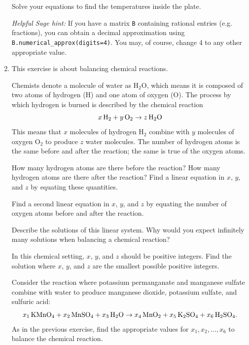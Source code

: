 \documentclass[12pt]{article}
\newcommand{\vs}[1]{\vspace{#1in}}
\begin{document}
\begin{enumerate}
  Solve your equations to find the temperatures
  inside the plate.

  {\em Helpful Sage hint:}  If you have a matrix
  {\tt B} containing rational entries (e.g. fractions), you can obtain
  a decimal approximation using {\tt B.numerical\_approx(digits=4)}.
  You may, of course, change 4 to any other appropriate value.
  
  \vs{2}

\item This exercise is about balancing chemical reactions.

  Chemists denote a molecule of water as
  $\text{H}_2\text{O}$, which means it is composed of two
  atoms of hydrogen (H) and one atom of oxygen (O).
  The process by which hydrogen is burned is described by the
  chemical reaction
  $$
  x\thinspace \text{H}_2 + y\thinspace\text{O}_2 \to
  z\thinspace \text{H}_2\text{O}
  $$
  This means that $x$ molecules of hydrogen
  $\text{H}_2$ combine with $y$ molecules of
  oxygen $\text{O}_2$ to produce $z$ water molecules.
  The number of hydrogen atoms is the same before and after
  the reaction;  the same is true of the oxygen atoms.

  \medskip
  How many hydrogen atoms are there before the
  reaction?  How many hydrogen atoms are there after the
  reaction?  Find a linear equation in $x$,
  $y$, and $z$ by equating these quantities.

  \vs{1}
  Find a second linear equation in $x$, $y$, and $z$
  by equating the number of
  oxygen atoms before and after the reaction.

  \vs{1}
  Describe the solutions of this linear system.
  Why would you expect infinitely many solutions when balancing a
  chemical reaction?

  \vs{2}
  In this chemical setting, $x$, $y$, and $z$
  should be positive integers.  Find
  the solution where $x$, $y$, and $z$
  are the smallest possible positive integers.

  \vs{1}


  Consider the reaction where potassium permanganate and manganese
  sulfate combine with water to produce manganese dioxide, potassium
  sulfate, and sulfuric acid:
  $$
  x_1\thinspace \mbox{K}\mbox{Mn}\mbox{O}_4 + 
  x_2\thinspace \mbox{Mn}\mbox{S}\mbox{O}_4 + 
  x_3\thinspace \mbox{H}_2\mbox{O} \to
  x_4\thinspace \mbox{Mn}\mbox{O}_2 + 
  x_5\thinspace \mbox{K}_2\mbox{S}\mbox{O}_4 + 
  x_6\thinspace \mbox{H}_2\mbox{S}\mbox{O}_4.
  $$
  As in the previous exercise, find the appropriate values for
  $x_1,x_2,\ldots, x_6$ to balance the chemical reaction.


\end{enumerate}
\end{document}
